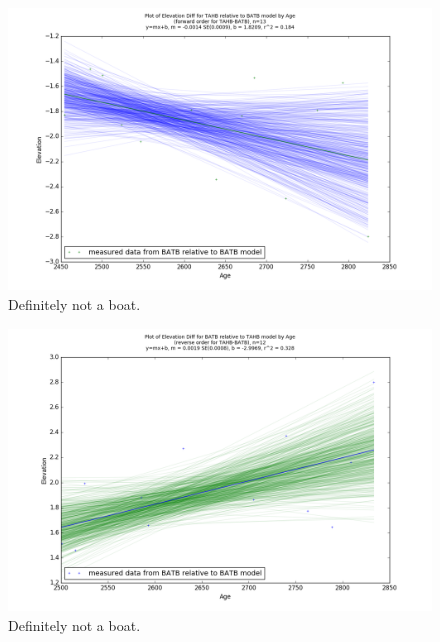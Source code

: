 \begin{figure}[h]
	\includegraphics[width=\linewidth]{data/gias/theGIA_TAHB_relative_to_BATB.png}
	\caption{Definitely not a boat.}
	\label{fig:gias_TAHBxBATB}
\end{figure}
\newpage


\begin{figure}[h]
	\includegraphics[width=\linewidth]{data/gias/theGIA_BATB_relative_to_TAHB.png}
	\caption{Definitely not a boat.}
	\label{fig:gias_BATBxTAHB}
\end{figure}
\newpage








